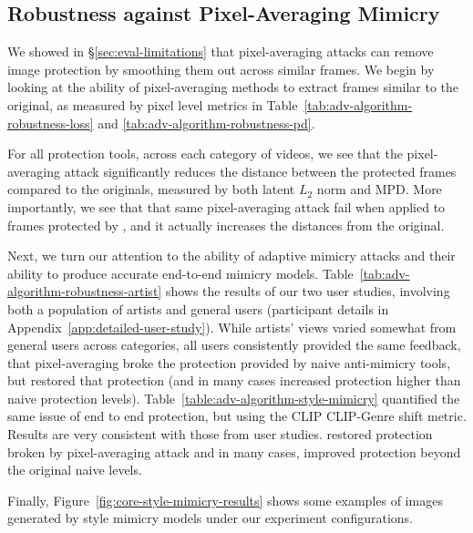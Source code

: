 \subsection{Robustness against Pixel-Averaging Mimicry}
\label{sec:protection-robustness}
We showed in \S\ref{sec:eval-limitations} that pixel-averaging attacks can
remove image protection by smoothing them out across similar
frames. We begin by looking at the ability of pixel-averaging methods to extract
frames similar to the original, as measured by pixel level metrics in
Table~\ref{tab:adv-algorithm-robustness-loss} and
\ref{tab:adv-algorithm-robustness-pd}.

For all protection tools, across each category of videos, we see that the
pixel-averaging attack significantly reduces the distance between the
protected frames compared to the originals, measured by both latent $L_2$ norm and
MPD. More importantly, we see that that same pixel-averaging attack fail when
applied to frames protected by \system{}, and it actually increases the
distances from the original.

Next, we turn our attention to the ability of adaptive mimicry attacks and
their ability to produce accurate end-to-end mimicry models. Table~\ref{tab:adv-algorithm-robustness-artist} shows the results of our
two user studies, involving both a population of artists and general users
(participant details in Appendix~\ref{app:detailed-user-study}). While
artists' views varied somewhat from general users across categories, all
users consistently provided the same feedback, that pixel-averaging broke the
protection provided by naive anti-mimicry tools, but \system{} restored that
protection (and in many cases increased protection higher than naive
protection levels). Table~\ref{table:adv-algorithm-style-mimicry} quantified
the same issue of end to end protection, but using the CLIP
CLIP-Genre shift metric. Results are very consistent with those from user
studies. \system{} restored protection broken by pixel-averaging attack and
in many cases, improved protection beyond the original naive levels.

Finally, Figure~\ref{fig:core-style-mimicry-results} shows some examples of
images generated by style mimicry models under our experiment configurations.

